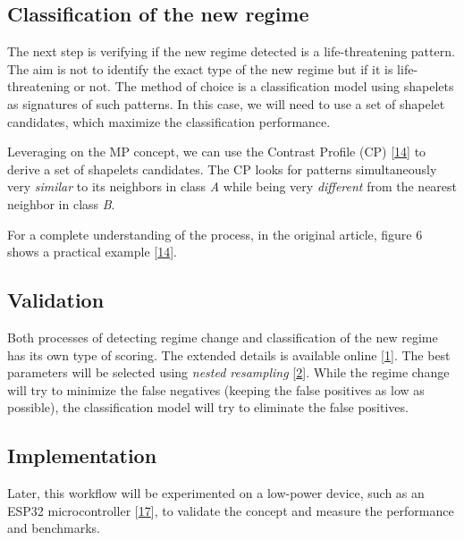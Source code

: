 \documentclass[runningheads]{llncs}
\begin{document}
\hypertarget{classification-of-the-new-regime}{%
\subsection{Classification of the new regime}\label{classification-of-the-new-regime}}

The next step is verifying if the new regime detected is a life-threatening pattern. The aim is not
to identify the exact type of the new regime but if it is life-threatening or not. The method of
choice is a classification model using shapelets as signatures of such patterns. In this case, we
will need to use a set of shapelet candidates, which maximize the classification performance.

Leveraging on the MP concept, we can use the Contrast Profile (CP) {[}\protect\hyperlink{ref-Mercer2021}{14}{]} to derive a set of
shapelets candidates. The CP looks for patterns simultaneously very \emph{similar} to its neighbors in
class \emph{A} while being very \emph{different} from the nearest neighbor in class \emph{B}.

For a complete understanding of the process, in the original article, figure 6 shows a practical
example {[}\protect\hyperlink{ref-Mercer2021}{14}{]}.

\hypertarget{validation}{%
\subsection{Validation}\label{validation}}

Both processes of detecting regime change and classification of the new regime has its own type of scoring.
The extended details is available online {[}\protect\hyperlink{ref-franz_evaluation}{1}{]}. The best parameters will be selected using
\emph{nested resampling} {[}\protect\hyperlink{ref-Bischl2012}{2}{]}. While the regime change will try to minimize the false negatives (keeping
the false positives as low as possible), the classification model will try to eliminate the false positives.

\hypertarget{implementation}{%
\subsection{Implementation}\label{implementation}}

Later, this workflow will be experimented on a low-power device, such as an ESP32 microcontroller
{[}\protect\hyperlink{ref-esp32}{17}{]}, to validate the concept and measure the performance and benchmarks.
\end{document}
